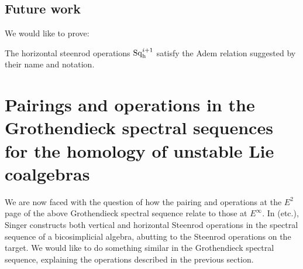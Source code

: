 \documentclass[11pt]{article}
\newcommand{\Sq}{\mathrm{Sq}}
\begin{document}
\subsection{Future work}
We would like to prove:
\begin{conjecture}
The horizontal steenrod operations $\Sq_\textup{h}^{i+1}$ satisfy the Adem relation suggested by their name and notation.
\end{conjecture}

\section{Pairings and operations in the Grothendieck spectral sequences for the homology of unstable Lie coalgebras}
We are now faced with the question of how the pairing and operations at the $E^2$ page of the above Grothendieck spectral sequence relate to those at $E^\infty$. In \cite{SingerSteen1.pdf} (etc.), Singer constructs both vertical and horizontal Steenrod operations in the spectral sequence of a bicosimplicial algebra, abutting to the Steenrod operations on the target. We would like to do something similar in the Grothendieck spectral sequence, explaining the operations described in the previous section.
\end{document}
